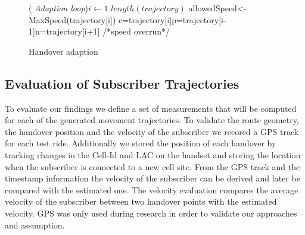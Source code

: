 \documentclass[twocolumn]{bmcart}%
\makeatletter
\newcommand{\removelatexerror}{\let\@latex@error\@gobble}
\makeatother
\begin{document}
\begin{figure}[!t]
 \removelatexerror
  \begin{algorithm}[H]
   \caption{Handover adaption}
   \label{alg:adaption}
   \For( \emph{Adaption loop}){$i\leftarrow 1$ \KwTo $length(trajectory)$}
   {
   	allowedSpeed<-MaxSpeed(trajectory[i])\;
   	c=trajectory[i]\;p=trajectory[i-1]\;n=trajectory[i+1]\;
      /*speed overrun*/\\
      }
  \end{algorithm}
\end{figure}
\subsection*{Evaluation of Subscriber Trajectories}
To evaluate our findings we define a set of measurements that will be computed for each of the generated movement trajectories. To validate the route geometry, the handover position and the velocity of the subscriber we recored a GPS track for each test ride. Additionally we stored the position of each handover by tracking changes in the Cell-Id and LAC on the handset and storing the location when the subscriber is connected to a new cell site. From the GPS track and the timestamp information the velocity of the subscriber can be derived and later be compared with the estimated one. The velocity evaluation compares  the average velocity of the subscriber between two handover points with the estimated velocity. GPS was only used during research in order to validate our approaches and assumption.
\end{document}
